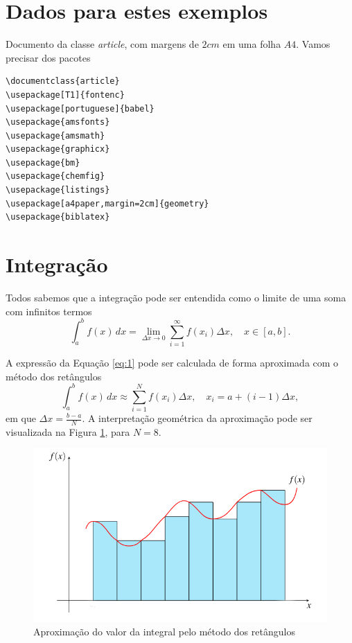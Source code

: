 \documentclass{article}
\begin{document}
\section{Dados para estes exemplos}
Documento da classe \textit{article}, com margens de $2cm$ em uma folha $A4$. Vamos precisar dos pacotes 
%
%
\begin{lstlisting}
\documentclass{article}
\usepackage[T1]{fontenc}
\usepackage[portuguese]{babel}
\usepackage{amsfonts}
\usepackage{amsmath}
\usepackage{graphicx}
\usepackage{bm}
\usepackage{chemfig}
\usepackage{listings}
\usepackage[a4paper,margin=2cm]{geometry}
\usepackage{biblatex}

\end{lstlisting}
\section{Integração}
Todos sabemos que a integração pode ser entendida como o limite de uma soma com infinitos termos
\begin{equation}\label{eq:1}
    \int_a^b f(x) \,dx = \lim_{\Delta x \to 0} \sum_{i=1}^\infty f(x_i)\Delta x, \quad x \in [a,b].
\end{equation}

A expressão da Equação \ref{eq:1} pode ser calculada de forma aproximada com o método dos retângulos
\begin{equation}\label{eq:retangulos}
    \int_a^b f(x) \,dx \approx  \sum_{i=1}^N f(x_i)\Delta x, \quad x_i = a + (i-1)\Delta x ,
\end{equation}
em que $\Delta x = \frac{b-a}{N}$. A interpretação geométrica da aproximação pode ser visualizada na Figura \ref{fig:retangulos}, para $N=8$.

\begin{figure}[h!]
    \centering
    \includegraphics[width=0.5\linewidth]{retangulos.png}
    \caption{Aproximação do valor da integral pelo método dos retângulos}
    \label{fig:retangulos}
\end{figure}
\end{document}
